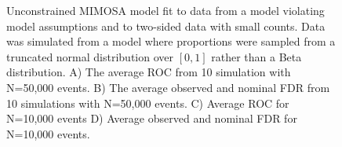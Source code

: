 \documentclass{article}
\begin{document}
\begin{figure}
\begin{tikzpicture} [auto,node distance=0cm]
 \end{tikzpicture}
   \caption{Unconstrained MIMOSA model fit to data from a model
     violating model assumptions and to two-sided data with small
     counts. Data was simulated from a model where proportions were
     sampled from a truncated normal distribution over $[0,1]$ rather
     than a Beta distribution.  A) The average ROC from 10 simulation
     with N=50,000 events. B) The average observed and nominal FDR from
     10 simulations with N=50,000 events. C) Average ROC for N=10,000
     events D) Average observed and nominal FDR for N=10,000 events.
}
   \label{webfig:simulations_trunc}
\end{figure}
\clearpage
\end{document}
